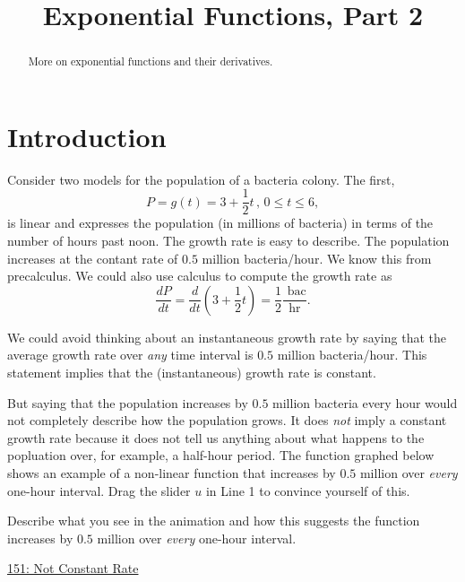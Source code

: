 \documentclass{ximera}
\title{Exponential Functions, Part 2}
\begin{document}
\begin{abstract}
More on exponential functions and their derivatives. 
\end{abstract}
\maketitle


\section{Introduction}

Consider two models for the population of a bacteria colony. The first,
\[
      P = g(t) =3 +\frac{1}{2}t \, , \, 0\leq t \leq 6,
\]
is linear and expresses the population (in millions of bacteria) in terms of the number of hours past noon. The growth rate is easy to describe. The population increases at the contant rate of $0.5$ million bacteria/hour. We know this from precalculus. We could also use calculus to compute the growth rate as
\[
    \frac{dP}{dt} = \frac{d}{dt}\left(  3 +\frac{1}{2}t   \right) = \frac{1}{2} \frac{\text{ bac}}{\text{hr}}.
\]

We could avoid thinking about an instantaneous growth rate by saying that the average growth rate over \emph{any} time interval is $0.5$ million bacteria/hour. This statement implies that the (instantaneous) growth rate is constant. 

But saying that the population increases by $0.5$ million bacteria every hour would not completely describe how the population grows. It does \emph{not} imply a constant growth rate because it does not tell us anything about what happens to the popluation over, for example, a half-hour period. The function graphed below shows an example of a non-linear function that increases by $0.5$ million over \emph{every} one-hour interval. Drag the slider $u$ in Line 1 to convince yourself of this.

Describe what you see in the animation and how this suggests the function increases by $0.5$ million over \emph{every} one-hour interval.

\begin{freeResponse}
\end{freeResponse}

\href{https://www.desmos.com/calculator/ehtzdzckmy}{151: Not Constant Rate}

 
\begin{onlineOnly}
    \begin{center}
\end{center}
\end{onlineOnly}
\end{document}
